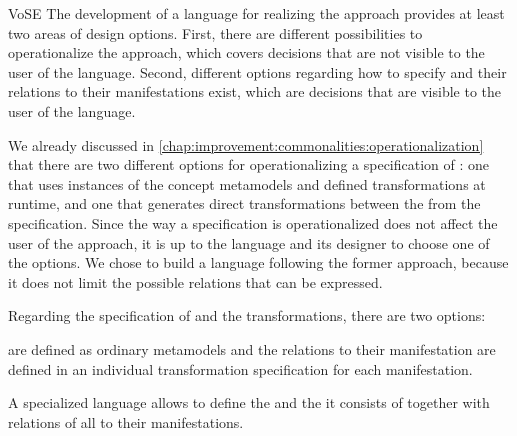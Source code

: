 \begin{copiedFrom}{VoSE}
The development of a language for realizing the \commonalities approach provides at least two areas of design options.
First, there are different possibilities to operationalize the approach, which covers decisions that are not visible to the user of the language.
Second, different options regarding how to specify \conceptmetamodels and their relations to their manifestations exist, which are decisions that are visible to the user of the language.

We already discussed in \autoref{chap:improvement:commonalities:operationalization} that there are two different options for operationalizing a specification of \commonalities: one that uses instances of the concept metamodels and defined transformations at runtime, and one that generates direct transformations between the \concretemetamodels from the specification.
Since the way a specification is operationalized does not affect the user of the approach, it is up to the language and its designer to choose one of the options.
We chose to build a language following the former approach, because it does not limit the possible relations that can be expressed.

Regarding the specification of \conceptmetamodels and the transformations, there are two options:
\begin{description}[leftmargin=\parindent]
    \item[External concept definition:] \Conceptmetamodels are defined as ordinary metamodels and the relations to their manifestation are defined in an individual transformation specification %
    for each manifestation. %
    \item[Internal concept definition:] A specialized language allows to define the \conceptmetamodel and the \commonalities it consists of together with relations of all \commonalities to their manifestations. %
\end{description}


\end{copiedFrom}

